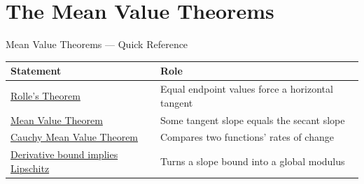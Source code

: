 \section{The Mean Value Theorems}

\begin{toolkitbox}{Mean Value Theorems --- Quick Reference}
\small
\begin{tabular}{l l}
\toprule
\textbf{Statement} & \textbf{Role} \\
\midrule
\hyperref[thm:rolles-theorem]{Rolle's Theorem} & Equal endpoint values force a horizontal tangent \\
\hyperref[thm:mean-value-theorem]{Mean Value Theorem} & Some tangent slope equals the secant slope \\
\hyperref[thm:cauchy-mean-value-theorem]{Cauchy Mean Value Theorem} & Compares two functions' rates of change \\
\hyperref[cor:derivative-bound-implies-lipschitz]{Derivative bound implies Lipschitz} & Turns a slope bound into a global modulus \\
\bottomrule
\end{tabular}
\end{toolkitbox}


